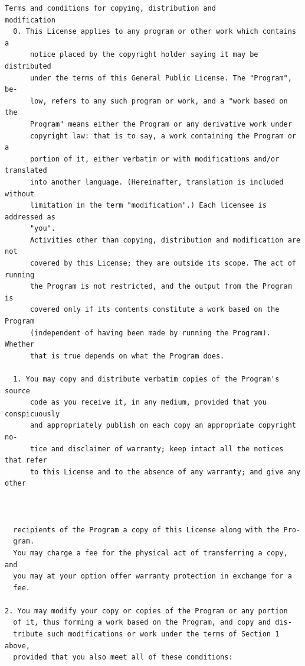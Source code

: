 \documentclass[11pt]{report}
\begin{document}
\begin{appendix}
\begin{verbatim}
Terms and conditions for copying, distribution and
modification
  0. This License applies to any program or other work which contains a
      notice placed by the copyright holder saying it may be distributed
      under the terms of this General Public License. The "Program", be-
      low, refers to any such program or work, and a "work based on the
      Program" means either the Program or any derivative work under
      copyright law: that is to say, a work containing the Program or a
      portion of it, either verbatim or with modifications and/or translated
      into another language. (Hereinafter, translation is included without
      limitation in the term "modification".) Each licensee is addressed as
      "you".
      Activities other than copying, distribution and modification are not
      covered by this License; they are outside its scope. The act of running
      the Program is not restricted, and the output from the Program is
      covered only if its contents constitute a work based on the Program
      (independent of having been made by running the Program). Whether
      that is true depends on what the Program does.

  1. You may copy and distribute verbatim copies of the Program's source
      code as you receive it, in any medium, provided that you conspicuously
      and appropriately publish on each copy an appropriate copyright no-
      tice and disclaimer of warranty; keep intact all the notices that refer
      to this License and to the absence of any warranty; and give any other



  recipients of the Program a copy of this License along with the Pro-
  gram.
  You may charge a fee for the physical act of transferring a copy, and
  you may at your option offer warranty protection in exchange for a
  fee.

2. You may modify your copy or copies of the Program or any portion
  of it, thus forming a work based on the Program, and copy and dis-
  tribute such modifications or work under the terms of Section 1 above,
  provided that you also meet all of these conditions:


\end{verbatim}
\end{appendix}
\end{document}
